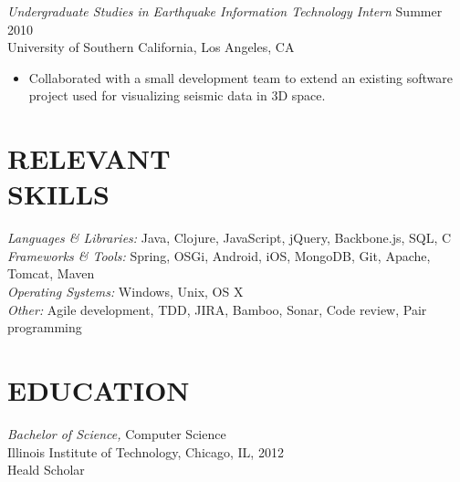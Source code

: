\documentclass[margin]{res}
\begin{document}
\begin{resume}
                {\sl Undergraduate Studies in Earthquake Information Technology Intern} \hfill        Summer 2010 \\
                University of Southern California, Los Angeles, CA
                 \begin{itemize}
                  \item Collaborated with a small development team to extend an existing software project used for visualizing seismic data in 3D space.
                  \end{itemize}

\section{RELEVANT \\ SKILLS} {\sl Languages \& Libraries:} Java, Clojure, JavaScript, jQuery, Backbone.js, SQL, C \\
                				{\sl Frameworks \& Tools:} Spring, OSGi, Android, iOS, MongoDB, Git, Apache, Tomcat, Maven \\
                                {\sl Operating Systems:} Windows, Unix, OS X \\
                                {\sl Other:} Agile development, TDD, JIRA, Bamboo, Sonar, Code review, Pair programming

\section{EDUCATION} {\sl Bachelor of Science,} Computer Science \\
                Illinois Institute of Technology, Chicago, IL,
                2012 \\
                Heald Scholar \\


\end{resume}
\end{document}

